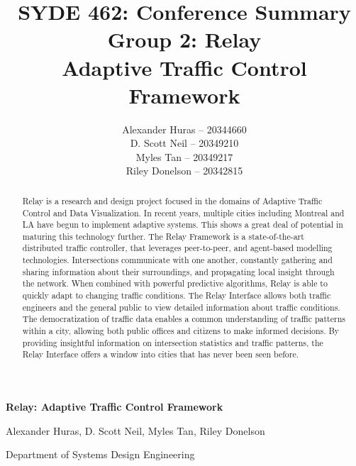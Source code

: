 \documentclass[a4paper,11pt]{article}
\author{  Alexander Huras -- 20344660\\
  D. Scott Neil -- 20349210\\
  Myles Tan -- 20349217\\
  Riley Donelson -- 20342815\\}
\title{SYDE 462: Conference Summary
\\Group 2: Relay \\
  Adaptive Traffic Control Framework}
\begin{document}
%

\centerline{  \bf \LARGE Relay: Adaptive Traffic Control Framework}
\centerline{Alexander Huras, D. Scott Neil, Myles Tan, Riley Donelson}
\centerline{Department of Systems Design Engineering}

\begin{abstract}
Relay is a research and design project focused in the domains of Adaptive Traffic Control and Data Visualization.
In recent years, multiple cities including Montreal and LA have begun to implement adaptive systems.
This shows a great deal of potential in maturing this technology further.
The Relay Framework is a state-of-the-art distributed traffic controller, that leverages peer-to-peer, and agent-based modelling technologies.
Intersections communicate with one another, constantly gathering and sharing information about their surroundings, and propagating local insight through the network.
When combined with powerful predictive algorithms, Relay is able to quickly adapt to changing traffic conditions.
The Relay Interface allows both traffic engineers and the general public to view detailed information about traffic conditions.
The democratization of traffic data enables a common understanding of traffic patterns within a city, allowing both public offices and citizens to make informed decisions.
By providing insightful information on intersection statistics and traffic patterns, the Relay Interface offers a window into cities that has never been seen before.
\end{abstract}
\end{document}
